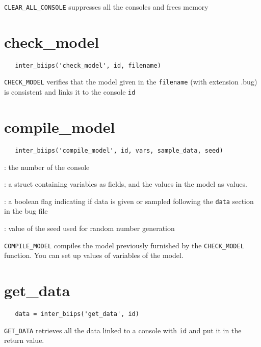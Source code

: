 \documentclass[11pt,twoside]{article}
\begin{document}
  \texttt{CLEAR\_ALL\_CONSOLE} suppresses all the consoles and frees memory

\section{check\_model}

 \begin{lstlisting}
   inter_biips('check_model', id, filename)
 \end{lstlisting}

 \texttt{CHECK\_MODEL} verifies that the model given in the \texttt{filename} (with extension .bug) is consistent and links it to the console \texttt{id}

\section{compile\_model}

 \begin{lstlisting}
   inter_biips('compile_model', id, vars, sample_data, seed)
 \end{lstlisting}
   \begin{description}
   \setlength{\baselineskip}{0.1\baselineskip}
     \item[\texttt{id}]: the number of the console
     \item[\texttt{vars}]: a struct containing variables as fields, and the values in the model as values.
     \item[\texttt{sample\_data}]: a boolean flag indicating if data is given or sampled following the \texttt{data} section in the bug file
     \item[\texttt{seed}]: value of the seed used for random number generation

   \end{description}

   \texttt{COMPILE\_MODEL} compiles the model previously furnished by the \texttt{CHECK\_MODEL} function. You can set up values of variables of
   the model.


\section{get\_data}

 \begin{lstlisting}
   data = inter_biips('get_data', id)
 \end{lstlisting}

  \texttt{GET\_DATA} retrieves all the data linked to a console with \texttt{id} and put it in the return value.
\end{document}
